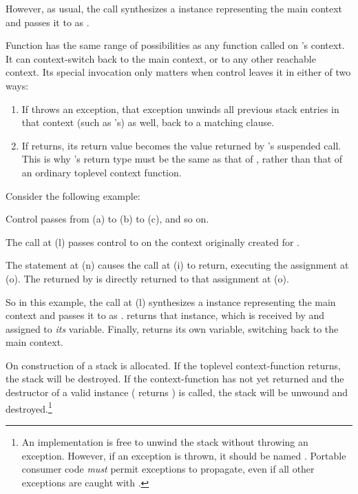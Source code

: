 However, as usual, the  call synthesizes a \ectx
instance representing the main context and passes it to 
as .

Function  has the same range of possibilities as any function called
on 's context. It can context-switch back to the main context, or to
any other reachable context. Its special invocation only matters when control
leaves it in either of two ways:

\begin{enumerate}
  \item If  throws an exception, that exception unwinds all previous
  stack entries in that context (such as 's) as well, back to a
  matching  clause.
  \item If  returns, its return value becomes the value returned
  by 's suspended  call. This is
  why 's return type must be the same as that of \op, rather than
  that of an ordinary toplevel context function.
\end{enumerate}

Consider the following example:


Control passes from (a) to (b) to (c), and so on.

The  call at (l) passes control
to  on the context originally created for .

The  statement at (n) causes the \op call at (i) to return,
executing the assignment at (o). The  returned by 
is directly returned to that assignment at (o).

So in this example, the call at (l) synthesizes a \ectx instance representing
the main context and passes it to  as .  returns
that  instance, which is received by  and assigned
to \emph{its}  variable. Finally,  returns its
own  variable, switching back to the main context.


On construction of  a stack is allocated. If the toplevel
context-function returns, the stack will be destroyed. If the context-function
has not yet returned and the destructor of a valid 
instance ( returns ) is
called, the stack will be unwound and destroyed.\footnote{An implementation is
free to unwind the stack without throwing an exception. However, if an
exception is thrown, it should be named .
Portable consumer code \emph{must} permit 
exceptions to propagate, even if all other exceptions are caught
with .}

